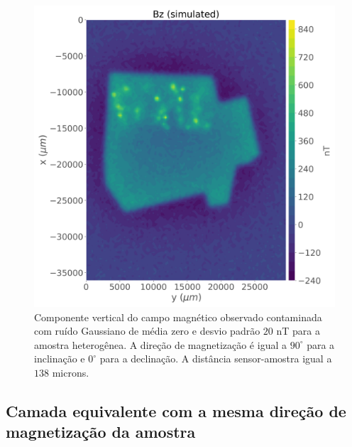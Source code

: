 \begin{figure}
	\centering
	\includegraphics[width=.8\textwidth]{Fig/mag_vec/simulacao_real_correto/noisy_bz_sample.png}
	\caption{Componente vertical do campo magnético observado contaminada com ruído Gaussiano de média zero e desvio padrão $20$ nT para a amostra heterogênea. A direção de magnetização é igual a $90^\circ$ para a inclinação e $0^\circ$ para a declinação. A distância sensor-amostra igual a $138$ microns. }
	\label{fig:bz_hetero_sample}
\end{figure}


\subsection{Camada equivalente com a mesma direção de magnetização da amostra}
\label{subsec:hetero_same_dir}

